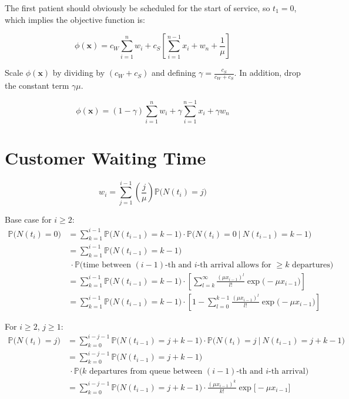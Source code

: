 The first patient should obviously be scheduled for the start of service, so $t_{1} = 0$, which implies the objective function is:

\begin{equation}
	\phi (\mathbf{x}) = c_{W} \sum_{i = 1}^{n} w_{i} + c_{S} \left[ \sum_{i = 1}^{n - 1} x_{i} + w_{n} + \frac{1}{\mu} \right]
\end{equation}

Scale $\phi (\mathbf{x})$ by dividing by $(c_{W} + c_{S})$ and defining $\gamma = \frac{c_{S}}{c_{W} + c_{S}}$. In addition, drop the constant term $\gamma \mu$.

\begin{equation}
	\phi (\mathbf{x}) = (1 - \gamma) \sum_{i = 1}^{n} w_{i} + \gamma \sum_{i = 1}^{n - 1} x_{i} + \gamma w_{n}
\end{equation}

\section{Customer Waiting Time}

\begin{equation}
	w_{i} = \sum_{j = 1}^{i - 1} \left( \frac{j}{\mu} \right) \mathbb{P} \Big( N (t_{i}) = j \Big)
\end{equation}

Base case for $i \geq 2$:
\begin{align*}
	\mathbb{P} \Big( N (t_{i}) = 0 \Big) & = \sum_{k = 1}^{i - 1} \mathbb{P} \Big( N (t_{i - 1}) = k - 1 \Big) \cdot \mathbb{P} \Big( N (t_{i}) = 0 \ \Big| \ N (t_{i - 1}) = k - 1 \Big) \\
	& = \sum_{k = 1}^{i - 1} \mathbb{P} \Big( N (t_{i - 1})= k - 1 \Big) \\
	& \ \cdot \mathbb{P} \Big( \text{time between $(i - 1)$-th and $i$-th arrival allows for $\geq k$ departures} \Big) \\
	& = \sum_{k = 1}^{i - 1} \mathbb{P} \Big( N (t_{i - 1}) = k - 1 \Big) \cdot \left[ \sum_{l = k}^{\infty} \frac{(\mu x_{i - 1})^{l}}{l!} \exp \Big( - \mu x_{i - 1} \Big) \right] \\
	& = \sum_{k = 1}^{i - 1} \mathbb{P} \Big( N (t_{i - 1}) = k - 1 \Big) \cdot \left[ 1 - \sum_{l = 0}^{k - 1} \frac{(\mu x_{i - 1})^{l}}{l!} \exp \Big( - \mu x_{i - 1} \Big) \right]
\end{align*}

For $i \geq 2$, $j \geq 1$:
\begin{align*}
	\mathbb{P} \Big( N (t_{i}) = j \Big) & = \sum_{k = 0}^{i - j - 1} \mathbb{P} \Big( N (t_{i - 1}) = j + k - 1 \Big) \cdot \mathbb{P} \Big( N (t_{i}) = j \ \Big| \ N (t_{i - 1}) = j + k - 1 \Big) \\
	& = \sum_{k = 0}^{i - j - 1} \mathbb{P} \Big( N (t_{i - 1}) = j + k - 1 \Big) \\
	& \ \cdot \mathbb{P} \Big( \text{$k$ departures from queue between $(i - 1)$-th and $i$-th arrival} \Big) \\
	& = \sum_{k = 0}^{i - j - 1} \mathbb{P} \Big( N (t_{i - 1}) = j + k - 1 \Big) \cdot \frac{(\mu x_{i - 1})^{k}}{k!} \exp \Big[ - \mu x_{i - 1} \Big]
\end{align*}

